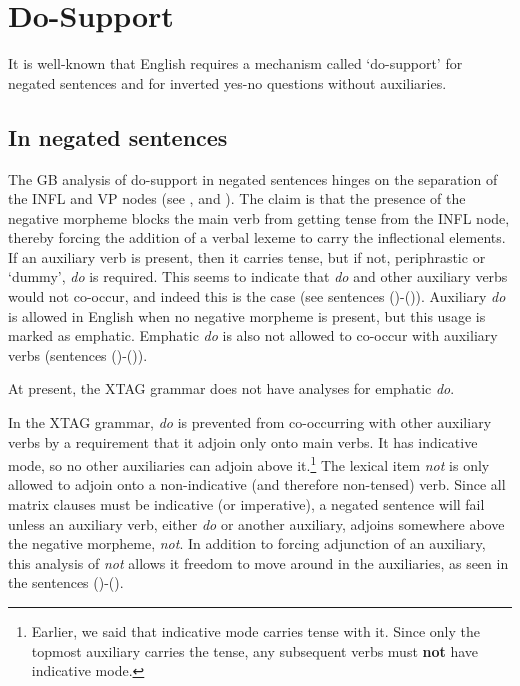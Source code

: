 \section{Do-Support}

It is well-known that English requires a mechanism called `do-support' for
negated sentences and for inverted yes-no questions without auxiliaries.


\subsection{In negated sentences}
\label{do-support-negatives}

The GB analysis of do-support in negated sentences hinges on the separation of
the INFL and VP nodes (see \cite{chomsky65}, \cite{jackendoff72} and
\cite{chomsky86}).  The claim is that the presence of the negative morpheme
blocks the main verb from getting tense from the INFL node, thereby forcing the
addition of a verbal lexeme to carry the inflectional elements.  If an
auxiliary verb is present, then it carries tense, but if not, periphrastic or
`dummy', {\it do} is required.  This seems to indicate that {\it do} and other
auxiliary verbs would not co-occur, and indeed this is the case (see sentences
()-()).  Auxiliary {\it do} is allowed in English when no
negative morpheme is present, but this usage is marked as emphatic.  Emphatic
{\it do} is also not allowed to co-occur with auxiliary verbs (sentences
()-()).


At present, the XTAG grammar does not have analyses for emphatic {\it do}.

In the XTAG grammar, {\it do} is prevented from co-occurring with other
auxiliary verbs by a requirement that it adjoin only onto main verbs.  It has
indicative mode, so no other auxiliaries can adjoin above it.\footnote{Earlier,
we said that indicative mode carries tense with it.  Since only the topmost
auxiliary carries the tense, any subsequent verbs must {\bf not} have
indicative mode.}  The lexical item {\it not} is only allowed to adjoin onto a
non-indicative (and therefore non-tensed) verb.  Since all matrix clauses must
be indicative (or imperative), a negated sentence will fail unless an auxiliary
verb, either {\it do} or another auxiliary, adjoins somewhere above the
negative morpheme, {\it not}. In addition to forcing adjunction of an
auxiliary, this analysis of {\it not} allows it freedom to move around in the
auxiliaries, as seen in the sentences ()-().

